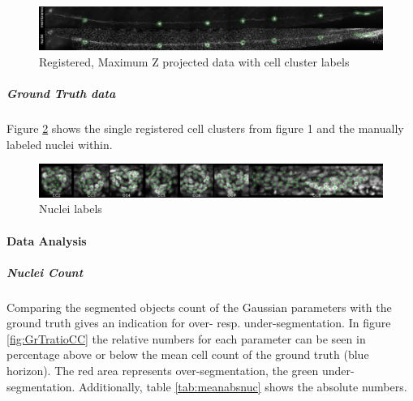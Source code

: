 \documentclass[11pt,singlespacinge,twoside]{reedthesis} %
\begin{document}
\begin{figure}

{\centering \includegraphics[width=0.9\linewidth]{figure/02-MaMo/GrTr/ClusterAnal/B06SB1P05_montage} 

}

\caption{Registered, Maximum Z projected data with cell cluster labels}\label{fig:maxllreg}
\end{figure}
\hypertarget{ground-truth-data}{%
\subparagraph{Ground Truth data}\label{ground-truth-data}}

Figure \ref{fig:countP05} shows the single registered cell clusters from figure 1 and the manually labeled nuclei within.


\begin{figure}

{\centering \includegraphics[width=0.9\linewidth]{figure/02-MaMo/GrTr/ClusterAnal/count_P05} 

}

\caption{Nuclei labels}\label{fig:countP05}
\end{figure}
\hypertarget{data-analysis}{%
\paragraph{Data Analysis}\label{data-analysis}}

\hypertarget{nuclei-count}{%
\subparagraph{Nuclei Count}\label{nuclei-count}}

Comparing the segmented objects count of the Gaussian parameters with the ground truth gives an indication for over- resp. under-segmentation. In figure \ref{fig:GrTratioCC} the relative numbers for each parameter can be seen in percentage above or below the mean cell count of the ground truth (blue horizon). The red area represents over-segmentation, the green under-segmentation. Additionally, table \ref{tab:meanabsnuc} shows the absolute numbers.
\end{document}

